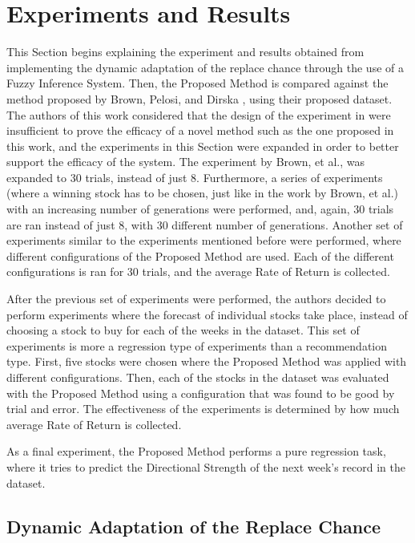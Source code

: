 \section{Experiments and Results}
\label{experiments-and-results}

This Section begins explaining the experiment and results obtained from implementing the dynamic adaptation of the replace chance through the use of a Fuzzy Inference System. Then, the Proposed Method is compared against the method proposed by Brown, Pelosi, and Dirska \cite{brown2013dynamic}, using their proposed dataset. The authors of this work considered that the design of the experiment in \cite{brown2013dynamic} were insufficient to prove the efficacy of a novel method such as the one proposed in this work, and the experiments in this Section were expanded in order to better support the efficacy of the system. The experiment by Brown, et al., was expanded to 30 trials, instead of just 8. Furthermore, a series of experiments (where a winning stock has to be chosen, just like in the work by Brown, et al.) with an increasing number of generations were performed, and, again, 30 trials are ran instead of just 8, with 30 different number of generations. Another set of experiments similar to the experiments mentioned before were performed, where different configurations of the Proposed Method are used. Each of the different configurations is ran for 30 trials, and the average Rate of Return is collected.

After the previous set of experiments were performed, the authors decided to perform experiments where the forecast of individual stocks take place, instead of choosing a stock to buy for each of the weeks in the dataset. This set of experiments is more a regression type of experiments than a recommendation type. First, five stocks were chosen where the Proposed Method was applied with different configurations. Then, each of the stocks in the dataset was evaluated with the Proposed Method using a configuration that was found to be good by trial and error. The effectiveness of the experiments is determined by how much average Rate of Return is collected.

As a final experiment, the Proposed Method performs a pure regression task, where it tries to predict the Directional Strength of the next week's record in the dataset.

\subsection{Dynamic Adaptation of the Replace Chance}

